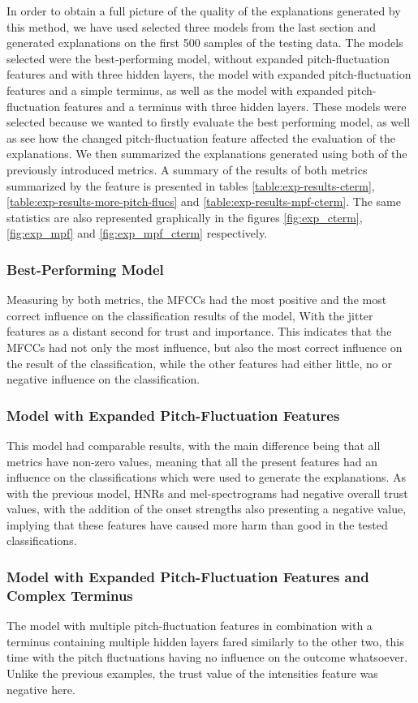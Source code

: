 \documentclass{article}
\begin{document}
		In order to obtain a full picture of the quality of the explanations generated by this
		method, we have used selected three models from the last section and generated explanations
		on the first 500 samples of the testing data. The models selected were the best-performing
		model, without expanded pitch-fluctuation features and with three hidden layers, the
		model with expanded pitch-fluctuation features and a simple terminus, as well as the model
		with expanded pitch-fluctuation features and a terminus with three hidden layers. These
		models were selected because we wanted to firstly evaluate the best performing model, as
		well as see how the changed pitch-fluctuation feature affected the evaluation of the
		explanations. We then summarized the explanations generated using both of the previously
		introduced metrics. A summary of the results of both metrics summarized by the feature is
		presented in tables \ref{table:exp-results-cterm}, \ref{table:exp-results-more-pitch-flucs}
		and \ref{table:exp-results-mpf-cterm}. The same statistics are also represented graphically
		in the figures \ref{fig:exp_cterm}, \ref{fig:exp_mpf} and \ref{fig:exp_mpf_cterm}
		respectively.
		\subsubsection{Best-Performing Model}
		Measuring by both metrics, the MFCCs had the most positive and the most correct influence
		on the classification results of the model, With the jitter features as a distant second
		for trust and importance. This indicates that the MFCCs had not only the most influence,
		but also the most correct influence on the result of the classification, while the other
		features had either little, no or negative influence on the classification.
		\subsubsection{Model with Expanded Pitch-Fluctuation Features}
		This model had comparable results, with the main difference being that all metrics have
		non-zero values, meaning that all the present features had an influence on the
		classifications which were used to generate the explanations. As with the previous model,
		HNRs and mel-spectrograms had negative overall trust values, with the addition of the
		onset strengths also presenting a negative value, implying that these features have caused
		more harm than good in the tested classifications.
		\subsubsection{Model with Expanded Pitch-Fluctuation Features and Complex Terminus}
		The model with multiple pitch-fluctuation features in combination with a terminus
		containing multiple hidden layers fared similarly to the other two, this time with the
		pitch fluctuations having no influence on the outcome whatsoever. Unlike the previous
		examples, the trust value of the intensities feature was negative here.
\end{document}
